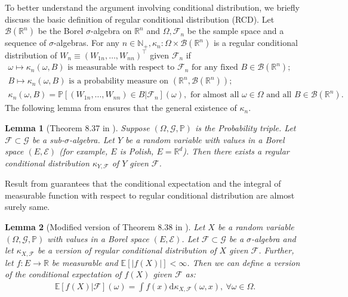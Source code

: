 \documentclass[12pt]{article}
\newtheorem{lemma}{Lemma}
\theoremstyle{definition}
\def\P{\mathbb{P}}
\def\P{\mathbb{P}}
\newcommand{\E}{\mathbb E}								%
\renewcommand{\P}{\mathbb{P}}							%
\begin{document}
To better understand the argument involving conditional distribution, we briefly discuss the basic definition of regular conditional distribution (RCD). Let $\mathcal{B}(\mathbb{R}^n)$ be the Borel $\sigma$-algebra on $\mathbb{R}^n$ and $\Omega,\mathcal{F}_n$ be the sample space and a sequence of $\sigma$-algebras. For any $n\in\mathbb{N}_+,\kappa_n:\Omega\times \mathcal{B}(\mathbb{R}^n)$ is a regular conditional distribution of $W_n\equiv (W_{1n},\ldots,W_{nn})^\top$ given $\mathcal{F}_n$ if 
\begin{align*}
	\omega\mapsto \kappa_n(\omega,B) \text{ is measurable with respect to $\mathcal{F}_n$ for any fixed $B\in\mathcal{B}(\mathbb{R}^n)$};
	&
	\\
	B\mapsto \kappa_n(\omega,B) \text{ is a probability measure on }(\mathbb{R}^n,\mathcal{B}(\mathbb{R}^n));
	&
	\\
	\kappa_n(\omega,B)=\P[(W_{1n},\ldots,W_{nn})\in B|\mathcal{F}_n](\omega),\text{ for almost all }\omega\in\Omega\text{ and all }B\in\mathcal{B}(\mathbb{R}^n).&
\end{align*}
The following lemma from \cite[Theorem 8.37]{Lista2017} ensures that the general existence of $\kappa_{n}$.
\begin{lemma}[Theorem 8.37 in \cite{Lista2017}]\label{lem:Klenke_Thm_8.37}
  Suppose $(\Omega,\mathcal{G},\P)$ is the Probability triple. Let $\mathcal{F}\subset \mathcal{G}$ be a sub-$\sigma$-algebra. Let $Y$ be a random variable with values in a Borel space $(E,\mathcal{E})$ (for example, $E$ is Polish, $E=\mathbb{R}^d$). Then there exists a regular conditional distribution $\kappa_{Y,\mathcal{F}}$ of $Y$ given $\mathcal{F}$.
\end{lemma}
\noindent Result from \cite[Theorem 8.38]{Lista2017} guarantees that the conditional expectation and the integral of measurable function with respect to regular conditional distribution are almost surely same.

\begin{lemma}[Modified version of Theorem 8.38 in \cite{Lista2017}]\label{lem:Klenke_Thm_8.38}
  Let $X$ be a random variable $(\Omega,\mathcal{G},\mathbb{P})$ with values in a Borel space $(E,\mathcal{E})$. Let $\mathcal{F}\subset \mathcal{G}$ be a $\sigma$-algebra and let $\kappa_{X,\mathcal{F}}$ be a version of regular conditional distribution of $X$ given $\mathcal{F}$. Further, let $f:E\rightarrow\mathbb{R}$ be measurable and $\E[|f(X)|]<\infty$. Then we can define a version of the conditional expectation of $f(X)$ given $\mathcal{F}$ as:
  \begin{align*}
    \E[f(X)|\mathcal{F}](\omega)=\int f(x)\mathrm{d}\kappa_{X,\mathcal{F}}(\omega,x),\ \forall \omega \in\Omega.
  \end{align*}
\end{lemma}
\end{document}
